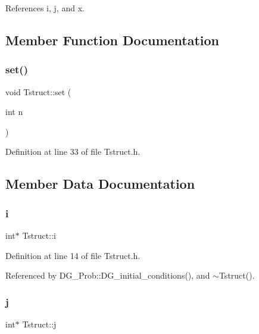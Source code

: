 References i, j, and x.



\subsection{Member Function Documentation}
\mbox{\label{structTstruct_a24d54c3caa12f19669ea826c3c5b7e9d}} 
\subsubsection{\texorpdfstring{set()}{set()}}
{\footnotesize\ttfamily void Tstruct\+::set (\begin{DoxyParamCaption}\item[{int}]{n }\end{DoxyParamCaption})\hspace{0.3cm}{\ttfamily [inline]}}



Definition at line 33 of file Tstruct.\+h.



\subsection{Member Data Documentation}
\mbox{\label{structTstruct_a1d62e8ec1881ec488a1428f5fe023ec6}} 
\subsubsection{\texorpdfstring{i}{i}}
{\footnotesize\ttfamily int$\ast$ Tstruct\+::i}



Definition at line 14 of file Tstruct.\+h.



Referenced by D\+G\+\_\+\+Prob\+::\+D\+G\+\_\+initial\+\_\+conditions(), and $\sim$\+Tstruct().

\mbox{\label{structTstruct_a6a815650d34c388525adf997bb518ba1}} 
\subsubsection{\texorpdfstring{j}{j}}
{\footnotesize\ttfamily int$\ast$ Tstruct\+::j}



